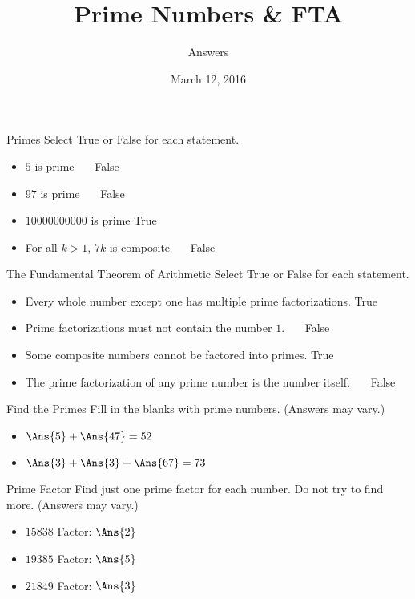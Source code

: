 \documentclass[12pt,letterpaper]{article}
\title{Prime Numbers \& FTA}
\author{Answers}
\date{March 12, 2016}
\begin{document}
\maketitle

\thispagestyle{empty}

\begin{problem}{Primes}
Select True or False for each statement.

\begin{itemize}
 \item $5$ is prime \hfill {}~~~False
 \item $97$ is prime \hfill {}~~~False
 \item $10000000000$ is prime \hfill True~~~
 \item For all $k>1$, $7k$ is composite \hfill {}~~~False
\end{itemize}
\end{problem}

\begin{problem}{The Fundamental Theorem of Arithmetic}
 Select True or False for each statement.

 \begin{itemize}
  \item Every whole number except one has multiple prime factorizations.
  \hfill True~~~
  \item Prime factorizations must not contain the number $1$.
  \hfill {}~~~False
  \item Some composite numbers cannot be factored into primes.
  \hfill True~~~
  \item The prime factorization of any prime number is the number itself.
  \hfill {}~~~False
 \end{itemize}

\end{problem}

\begin{problem}{Find the Primes}
 Fill in the blanks with prime numbers. (Answers may vary.)

 \begin{itemize}
  \item $\Ans{5} + \Ans{47} = 52$
  \item $\Ans{3} + \Ans{3} + \Ans{67} = 73$
 \end{itemize}
\end{problem}


\begin{problem}{Prime Factor}
 Find just one prime factor for each number. Do not try to find more.
 (Answers may vary.)

 \begin{itemize}
  \item $15838$ \hfill Factor: $\Ans{2}$
  \item $19385$ \hfill Factor: $\Ans{5}$
  \item $21849$ \hfill Factor: $\Ans{3}$
 \end{itemize}
\end{problem}
\end{document}
